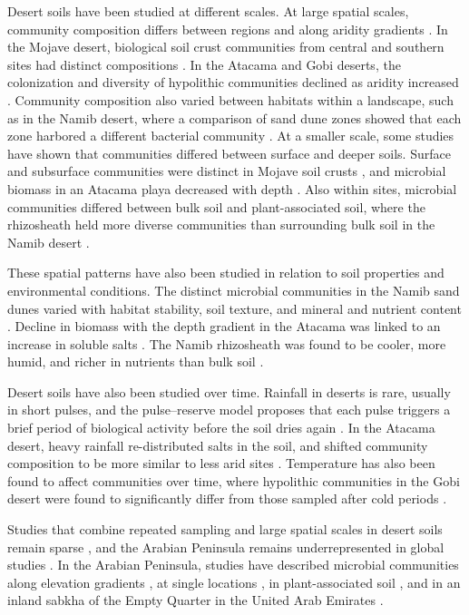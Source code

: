 \documentclass[fleqn,10pt,numbers]{olplainarticle}
\begin{document}
Desert soils have been studied at different scales. At large spatial scales, community composition differs between regions and along aridity gradients \cite{neilson2017significant}. In the Mojave desert, biological soil crust communities from central and southern sites had distinct compositions \cite{pombubpa2020mojave}. In the Atacama and Gobi deserts, the colonization and diversity of hypolithic communities declined as aridity increased \cite{warren2006hypolithic, wu2023seasonal}. Community composition also varied between habitats within a landscape, such as in the Namib desert, where a comparison of sand dune zones showed that each zone harbored a different bacterial community \cite{ronca2015namib}. At a smaller scale, some studies have shown that communities differed between surface and deeper soils. Surface and subsurface communities were distinct in Mojave soil crusts \cite{pombubpa2020mojave}, and microbial biomass in an Atacama playa decreased with depth \cite{horstmann2024atacama}. Also within sites, microbial communities differed between bulk soil and plant-associated soil, where the rhizosheath held more diverse communities than surrounding bulk soil in the Namib desert \cite{marasco2022namib}.


These spatial patterns have also been studied in relation to soil properties and environmental conditions. The distinct microbial communities in the Namib sand dunes varied with habitat stability, soil texture, and mineral and nutrient content \cite{ronca2015namib}. Decline in biomass with the depth gradient in the Atacama was linked to an increase in soluble salts \cite{horstmann2024atacama}. The Namib rhizosheath was found to be cooler, more humid, and richer in nutrients than bulk soil \cite{marasco2022namib}.


Desert soils have also been studied over time. Rainfall in deserts is rare, usually in short pulses, and the pulse--reserve model proposes that each pulse triggers a brief period of biological activity before the soil dries again \cite{noymeir1973desert, schwinning2004pulse}. In the Atacama desert, heavy rainfall re-distributed salts in the soil, and shifted community composition to be more similar to less arid sites \cite{uritskiy2019atacama,shen2021atacama}. Temperature has also been found to affect communities over time, where hypolithic communities in the Gobi desert were found to significantly differ from those sampled after cold periods \cite{wu2023seasonal}.


Studies that combine repeated sampling and large spatial scales in desert soils remain sparse \cite{yuan2017experimental}, and the Arabian Peninsula remains underrepresented in global studies \cite{maestre2015increasing, blancosacristan2025biocrust}. In the Arabian Peninsula, studies have described microbial communities along elevation gradients \cite{yasir2015elevation}, at single locations \cite{khan2020saudi}, in plant-associated soil \cite{osman2016jizan,eida2018desertplants,jalal2022saudi}, and in an inland sabkha of the Empty Quarter in the United Arab Emirates \cite{mckay2016sabkha}.
\end{document}
